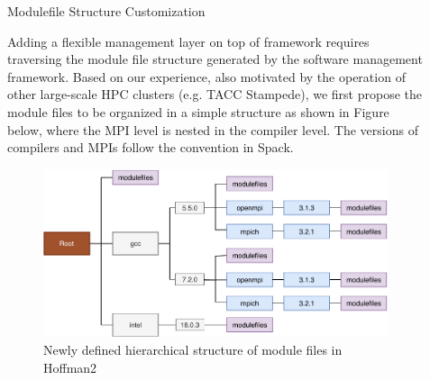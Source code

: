 \documentclass[final]{beamer}
\newlength{\sepwid}
\newlength{\onecolwid}
\begin{document}
\begin{frame}[t]
\begin{columns}[t]
\begin{column}{\onecolwid}



\end{column} %



\begin{column}{\sepwid}\end{column} %

\begin{column}{\onecolwid} %



\begin{block}{Modulefile Structure Customization}

Adding a flexible management layer on top of framework requires traversing the module file structure generated by the software management framework.
Based on our experience, also motivated by the operation of other large-scale HPC clusters (e.g. TACC Stampede), we first propose the module files to be organized in a simple structure as shown in Figure below, where the MPI level is nested in the compiler level. 
The versions of compilers and MPIs follow the convention in Spack. 

\vspace{0.75em}
\begin{figure}[htbp]
  \centerline{\includegraphics[width=0.9\linewidth]{figures/h2_new_hier}}
  \caption{Newly defined hierarchical structure of module files in Hoffman2}
  \label{fig:h2_new_hier}
\end{figure}



\end{block}
\end{column}
\end{columns}
\end{frame}
\end{document}
